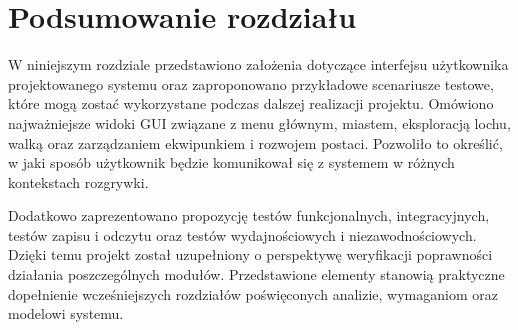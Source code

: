 \section{Podsumowanie rozdziału}
\label{sec:podsumowanie-rozdzialu-3}

W niniejszym rozdziale przedstawiono założenia dotyczące interfejsu użytkownika projektowanego systemu oraz zaproponowano przykładowe scenariusze testowe, które mogą zostać wykorzystane podczas dalszej realizacji projektu. Omówiono najważniejsze widoki GUI związane z menu głównym, miastem, eksploracją lochu, walką oraz zarządzaniem ekwipunkiem i rozwojem postaci. Pozwoliło to określić, w jaki sposób użytkownik będzie komunikował się z systemem w różnych kontekstach rozgrywki.

Dodatkowo zaprezentowano propozycję testów funkcjonalnych, integracyjnych, testów zapisu i odczytu oraz testów wydajnościowych i niezawodnościowych. Dzięki temu projekt został uzupełniony o perspektywę weryfikacji poprawności działania poszczególnych modułów. Przedstawione elementy stanowią praktyczne dopełnienie wcześniejszych rozdziałów poświęconych analizie, wymaganiom oraz modelowi systemu.